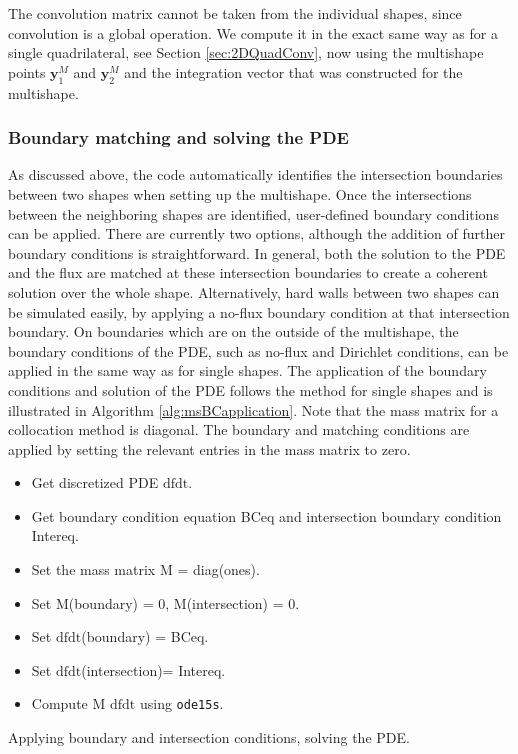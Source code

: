 The convolution matrix cannot be taken from the individual shapes, since convolution is a global operation. We compute it in the exact same way as for a single quadrilateral, see Section \ref{sec:2DQuadConv}, now using the multishape points $\mathbf{y}_1^M$ and $\mathbf{y}_2^M$ and the integration vector that was constructed for the multishape.



\subsubsection{Boundary matching and solving the PDE}
As discussed above, the code automatically identifies the intersection boundaries between two shapes when setting up the multishape. Once the intersections between the neighboring shapes are identified, user-defined boundary conditions can be applied. There are currently two options, although the addition of further boundary conditions is straightforward. In general, both the solution to the PDE and the flux are matched at these intersection boundaries to create a coherent solution over the whole shape. Alternatively, hard walls between two shapes can be simulated easily, by applying a no-flux boundary condition at that intersection boundary. On boundaries which are on the outside of the multishape, the boundary conditions of the PDE, such as no-flux and Dirichlet conditions, can be applied in the same way as for single shapes.
The application of the boundary conditions and solution of the PDE follows the method for single shapes and is illustrated in Algorithm \ref{alg:msBCapplication}. Note that the mass matrix for a collocation method is diagonal. The boundary and matching conditions are applied by setting the relevant entries in the mass matrix to zero.
\\
\begin{algorithm}[H]
	\SetAlgoLined
	\begin{itemize}
		\item Get discretized PDE $\text{dfdt}$.
		\item Get boundary condition equation BCeq and intersection boundary condition Intereq.
		\item Set the mass matrix M = diag(ones).
		\item Set M(boundary) = 0,  M(intersection) = 0.
		\item Set $\text{dfdt}$(boundary) = BCeq.
		\item Set $\text{dfdt}$(intersection)= Intereq.
		\item Compute M $\text{dfdt}$ using \texttt{ode15s}.
	\end{itemize}
	
	\caption{Applying boundary and intersection conditions, solving the PDE.}
	\label{alg:msBCapplication}
\end{algorithm}


